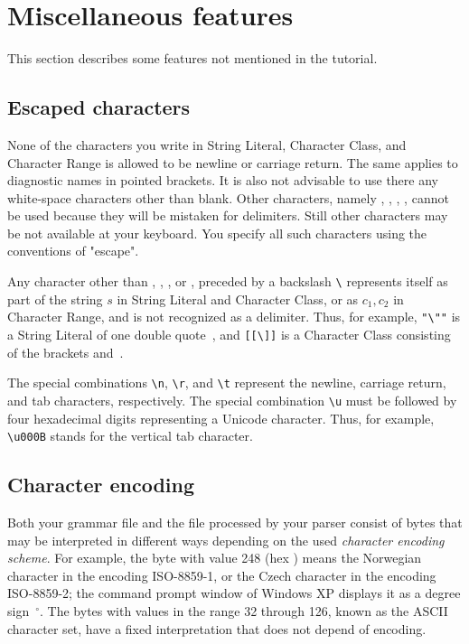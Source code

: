 
\section{Miscellaneous features}


This section describes some features not mentioned in the tutorial.

\subsection{Escaped characters\label{escape}}

None of the characters you write in String Literal, Character Class, and Character Range
is allowed to be newline or carriage return.
The same applies to diagnostic names in pointed brackets.
It is also not advisable to use there any white-space characters other than blank.
Other characters, namely , \tx{]}, \tx{-}, \tx{>}, cannot be used because they will be mistaken
for delimiters. 
Still other characters may be not available at your keyboard.
You specify all such characters using the conventions of "escape". 

Any character other than , , , or ,
preceded by a backslash \verb#\# represents itself as part of the string $s$
in String Literal and Character Class,
or as $c_1, c_2$ in Character Range, and is not recognized as a delimiter.
Thus, for example, \verb#"\""# is a String Literal of one double quote~,
and \verb#[[\]]# is a Character Class consisting of the brackets \tx{[} and~\tx{]}.

The special combinations \verb#\n#, \verb#\r#, and \verb#\t# represent
the newline, carriage return, and tab characters, respectively.
The special combination \verb#\u# must be followed by four hexadecimal digits
representing a Unicode character. 
Thus, for example, \verb#\u000B# stands for the vertical tab character.


\subsection{Character encoding}

Both your grammar file and the file processed by your parser 
consist of bytes
that may be interpreted in different ways
depending on the used \emph{character encoding scheme}.
For example, the byte with value 248 (hex ) means the Norwegian character \tx{\o} 
in the encoding ISO-8859-1, or the Czech character 
in the encoding ISO-8859-2;
the command prompt window of Windows XP displays it as a degree sign~$ ^\circ$.
The bytes with values in the range 32 through 126, known as the ASCII character set,
have a fixed interpretation that does not depend of encoding.


